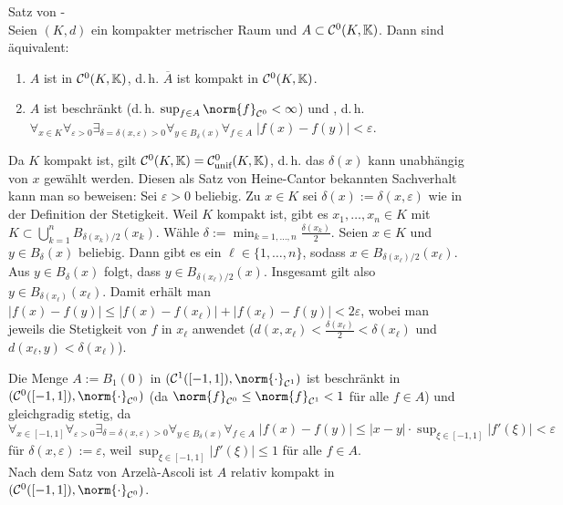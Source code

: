 \linie

\begin{Satz}{Satz von -}\\
    Seien $(K, d)$ ein kompakter metrischer Raum und $A \subset \mathcal{C}^0(K, \mathbb{K})$.
    Dann sind äquivalent:
    \begin{enumerate}
        \item
        $A$ ist  in $\mathcal{C}^0(K, \mathbb{K})$, d.\,h.
        $\overline{A}$ ist kompakt in $\mathcal{C}^0(K, \mathbb{K})$.
        
        \item
        $A$ ist beschränkt (d.\,h. $\sup_{f \in A} \norm{f}_{\C^0} < \infty$)
        und , d.\,h.
        \\$\forall_{x \in K} \forall_{\varepsilon > 0}
        \exists_{\delta = \delta(x, \varepsilon) > 0}
        \forall_{y \in B_\delta(x)} \forall_{f \in A}\; |f(x) - f(y)| < \varepsilon$.
    \end{enumerate}
\end{Satz}

\begin{Bem}
    Da $K$ kompakt ist, gilt $\mathcal{C}^0(K, \mathbb{K}) = \mathcal{C}^0_{\text{unif}}(K, \mathbb{K})$,
    d.\,h. das $\delta(x)$ kann unabhängig von $x$ gewählt werden.
    Diesen als Satz von Heine-Cantor bekannten Sachverhalt kann man so beweisen:
    Sei $\varepsilon > 0$ beliebig.
    Zu $x \in K$ sei $\delta(x) := \delta(x, \varepsilon)$ wie in der Definition der Stetigkeit.
    Weil $K$ kompakt ist, gibt es $x_1, \dotsc, x_n \in K$ mit
    $K \subset \bigcup_{k=1}^n B_{\delta(x_k)/2}(x_k)$.
    Wähle $\delta := \min_{k=1,\dotsc,n} \frac{\delta(x_k)}{2}$.
    Seien $x \in K$ und $y \in B_\delta(x)$ beliebig.
    Dann gibt es ein $\ell \in \{1, \dotsc, n\}$, sodass
    $x \in B_{\delta(x_\ell)/2}(x_\ell)$.
    Aus $y \in B_\delta(x)$ folgt, dass $y \in B_{\delta(x_\ell)/2}(x)$.
    Insgesamt gilt also $y \in B_{\delta(x_\ell)}(x_\ell)$.
    Damit erhält man
    $|f(x) - f(y)| \le |f(x) - f(x_\ell)| + |f(x_\ell) - f(y)| < 2\varepsilon$,
    wobei man jeweils die Stetigkeit von $f$ in $x_\ell$ anwendet
    ($d(x, x_\ell) < \frac{\delta(x_\ell)}{2} < \delta(x_\ell)$ und
    $d(x_\ell, y) < \delta(x_\ell)$).
\end{Bem}

\begin{Bsp}
    Die Menge $A := B_1(0)$ in $(\C^1([-1, 1]), \norm{\cdot}_{\C^1})$
    ist beschränkt in $(\C^0([-1, 1]), \norm{\cdot}_{\C^0})$
    (da $\norm{f}_{\C^0} \le \norm{f}_{\C^1} < 1$ für alle $f \in A$)
    und gleichgradig stetig, da\\
    $\forall_{x \in [-1, 1]} \forall_{\varepsilon > 0}
    \exists_{\delta = \delta(x, \varepsilon) > 0} \forall_{y \in B_\delta(x)}
    \forall_{f \in A}\; |f(x) - f(y)| \le |x - y| \cdot
    \sup_{\xi \in [-1, 1]} |f'(\xi)| < \varepsilon$
    für $\delta(x, \varepsilon) := \varepsilon$,
    weil $\sup_{\xi \in [-1, 1]} |f'(\xi)| \le 1$ für alle $f \in A$.\\
    Nach dem Satz von Arzelà-Ascoli ist $A$ relativ kompakt in
    $(\C^0([-1, 1]), \norm{\cdot}_{\C^0})$.
\end{Bsp}

